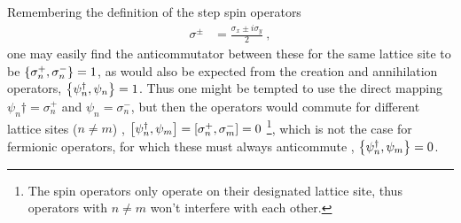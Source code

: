 \documentclass[../main.tex]{subfiles} %
\begin{document}
Remembering the definition of the step spin operators \cite{sakurai_modernQM_2017}
\begin{align}
    \sigma^\pm &= \frac{\sigma_x \pm i \sigma_y}{2} \: ,
\end{align}
one may easily find the anticommutator between these for the same lattice site to be $\anticommutator{\sigma_n^+}{\sigma_n^-} = 1$, as would also be expected from the creation and annihilation operators, $\anticommutator{\psi_n\dagger}{\psi_n} = 1$. Thus one might be tempted to use the direct mapping $\psi_n\dagger = \sigma_n^+$ and $\psi_n = \sigma_n^-$, but then the operators would commute for different lattice sites ($n \ne m$) \cite{susskind_latticeFermions_1977}, $\commutator{\psi_n\dagger}{\psi_m} = \commutator{\sigma_n^+}{\sigma_m^-} = 0$ \footnote{The spin operators only operate on their designated lattice site, thus operators with $n \ne m$ won't interfere with each other.}, which is not the case for fermionic operators, for which these must always anticommute \cite{sakurai_modernQM_2017}, $\anticommutator{\psi_n\dagger}{\psi_m} = 0$.
\end{document}
